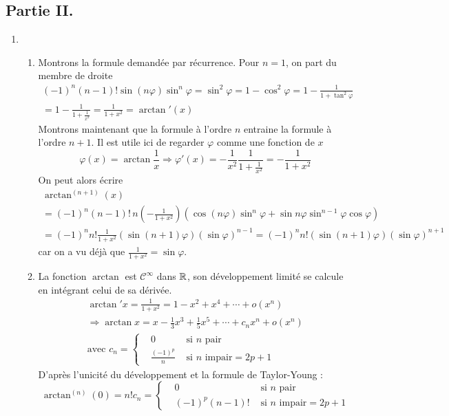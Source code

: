 \subsection*{Partie II.}
\begin{enumerate}
 \item
\begin{enumerate}
\item Montrons la formule demandée par récurrence.\newline
Pour $n=1$, on part du membre de droite
\begin{multline*}
 (-1)^n(n-1)!\sin(n\varphi)\sin^n\varphi
= \sin^2 \varphi
= 1-\cos^2 \varphi = 1-\frac{1}{1+\tan^2\varphi} \\
=1-\frac{1}{1+\frac{1}{x^2}}= \frac{1}{1+x^2}=\arctan'(x)
\end{multline*}
Montrons maintenant que la formule à l'ordre $n$ entraine la formule à l'ordre $n+1$. Il est utile ici de regarder $\varphi$ comme une fonction de $x$
\begin{displaymath}
 \varphi(x) = \arctan\frac{1}{x}\Rightarrow
\varphi'(x) = -\frac{1}{x^2}\frac{1}{1+\frac{1}{x^2}}=-\frac{1}{1+x^2}
\end{displaymath}
On peut alors écrire
\begin{multline*}
 \arctan^{(n+1)}(x)\\= (-1)^n(n-1)!\,n\left(-\frac{1}{1+x^2} \right)
\left(\cos(n\varphi)\sin^n\varphi +\sin n\varphi\sin^{n-1}\varphi \cos \varphi\right)\\ 
= (-1)^nn!\frac{1}{1+x^2}(\sin(n+1)\varphi)(\sin \varphi)^{n-1}
= (-1)^nn!(\sin(n+1)\varphi)(\sin \varphi)^{n+1}
\end{multline*}
car on a vu déjà que $\frac{1}{1+x^2}=\sin \varphi$.
\item La fonction $\arctan$ est $\mathcal C ^\infty$ dans $\mathbb{R}$, son développement limité se calcule en intégrant celui de sa dérivée.
\begin{multline*}
 \arctan'x = \frac{1}{1+x^2}=1-x^2+x^4+\cdots+o(x^n)\\\Rightarrow
\arctan x = x-\frac{1}{3}x^3+\frac{1}{5}x^5+\cdots+c_nx^n+o(x^n)\\
\text{avec }
c_n=
\left\lbrace 
\begin{aligned}
 &0 &\text{ si } n\text{ pair}\\
& \frac{(-1)^p}{n}&\text{ si } n\text{ impair}=2p+1
\end{aligned}
\right. 
\end{multline*}
D'après l'unicité du développement et la formule de Taylor-Young :
\begin{displaymath}
 \arctan^{(n)}(0)=n!c_n
=
\left\lbrace 
\begin{aligned}
 &0 &\text{ si } n\text{ pair}\\
& (-1)^p(n-1)!&\text{ si } n\text{ impair}=2p+1
\end{aligned}
\right. 
\end{displaymath}


\end{enumerate}
\end{enumerate}
